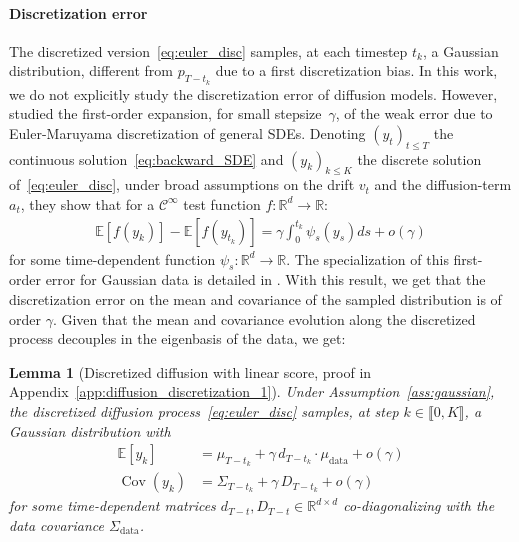 \documentclass[11pt]{article}
\newtheorem{lem}{Lemma}
\newcommand{\id}{\operatorname{Id}}
\newcommand{\RR}{\mathbb{R}}
\newcommand{\EE}{\mathbb{E}}
\begin{document}
\paragraph{Discretization error} 
The discretized version~\eqref{eq:euler_disc} samples, at each timestep $t_k$, a Gaussian distribution, different from $p_{T-t_k}$ due to a first discretization bias. 
In this work, we do not explicitly study the discretization error of diffusion models. However, \cite{talay1990expansion} studied the first-order expansion, for small stepsize~$\gamma$, of the weak error due to Euler-Maruyama discretization of general SDEs. Denoting $(y_t)_{t\leq T}$ the continuous solution~\eqref{eq:backward_SDE} and $(y_k)_{k \leq K}$ the discrete solution of~\eqref{eq:euler_disc}, under broad assumptions on the drift $v_t$ and the diffusion-term $a_t$, they show that for a $\mathcal{C}^\infty$ test function $f : \RR^d \to \RR$:
\begin{align*}
\EE[f(y_k)] - \EE[f(y_{t_k})] = \gamma \int_0^{t_k} \psi_s(y_{s})ds + o(\gamma)
\end{align*}
for some time-dependent function $\psi_s : \RR^d \to \RR$. The specialization of this first-order error for Gaussian data is detailed in \cite{hurault2026geometry}. With this result, we get that the discretization error on the mean and covariance of the sampled distribution is of order $\gamma$. Given that the mean and covariance evolution along the discretized process decouples in the eigenbasis of the data, we get:
\begin{lem}[Discretized diffusion with linear score, proof in Appendix~\ref{app:diffusion_discretization_1}] \label{prop:diffusion_discretization_1}
Under Assumption~\ref{ass:gaussian}, the discretized diffusion process~\eqref{eq:euler_disc} samples, at step $k \in \llbracket 0, K \rrbracket$, a Gaussian distribution with %
\begin{align*} 
\EE[y_{k}] &= \mu_{T-t_k} + \gamma \, d_{T-t_k} \cdot \mu_{\mathrm{data}} + o(\gamma)  \\
\operatorname{Cov}(y_k) &=  \Sigma_{T-t_k} +  \gamma \,  D_{T-t_k} + o(\gamma) 
\end{align*}
for some time-dependent matrices $d_{T-t}, D_{T-t} \in \RR^{d \times d}$ co-diagonalizing with the data covariance $\Sigma_{\mathrm{data}}$. 
\end{lem} 
\end{document}
